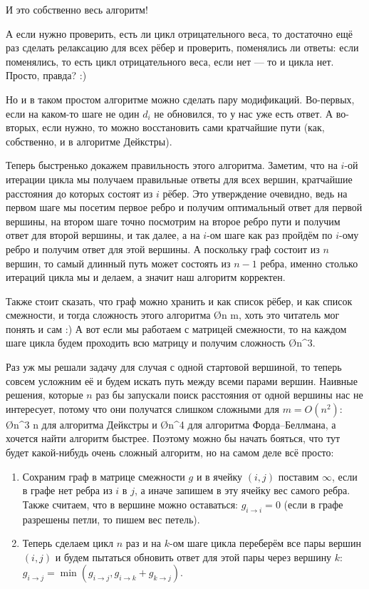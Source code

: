 И это собственно весь алгоритм!

А если нужно проверить, есть ли цикл отрицательного веса, то достаточно ещё раз сделать релаксацию для всех рёбер и проверить, поменялись ли ответы: если поменялись, то есть цикл отрицательного веса, если нет — то и цикла нет. Просто, правда? :)

Но и в таком простом алгоритме можно сделать пару модификаций. Во-первых, если на каком-то шаге не один $d_i$ не обновился, то у нас уже есть ответ. А во-вторых, если нужно, то можно восстановить сами кратчайшие пути (как, собственно, и в алгоритме Дейкстры).

Теперь быстренько докажем правильность этого алгоритма. Заметим, что на $i$-ой итерации цикла мы получаем правильные ответы для всех вершин, кратчайшие расстояния до которых состоят из $i$ рёбер. Это утверждение очевидно, ведь на первом шаге мы посетим первое ребро и получим оптимальный ответ для первой вершины, на втором шаге точно посмотрим на второе ребро пути и получим ответ для второй вершины, и так далее, а на $i$-ом шаге как раз пройдём по $i$-ому ребро и получим ответ для этой вершины. А поскольку граф состоит из $n$ вершин, то самый длинный путь может состоять из $n - 1$ ребра, именно столько итераций цикла мы и делаем, а значит наш алгоритм корректен.

Также стоит сказать, что граф можно хранить и как список рёбер, и как список смежности, и тогда сложность этого алгоритма \O{n m}, хоть это читатель мог понять и сам :) А вот если мы работаем с матрицей смежности, то на каждом шаге цикла будем проходить всю матрицу и получим сложность \O{n^3}.


Раз уж мы решали задачу для случая с одной стартовой вершиной, то теперь совсем усложним её и будем искать путь между всеми парами вершин. Наивные решения, которые $n$ раз бы запускали поиск расстояния от одной вершины нас не интересует, потому что они получатся слишком сложными для $m = O(n^2)$: \O{n^3 \log n} для алгоритма Дейкстры и \O{n^4} для алгоритма Форда–Беллмана, а хочется найти алгоритм быстрее. Поэтому можно бы начать бояться, что тут будет какой-нибудь очень сложный алгоритм, но на самом деле всё просто:

\begin{enumerate}
    \item Сохраним граф в матрице смежности $g$ и в ячейку $(i, j)$ поставим $\infty$, если в графе нет ребра из $i$ в $j$, а иначе запишем в эту ячейку вес самого ребра. Также считаем, что в вершине можно оставаться: $g_{i \to i} = 0$ (если в графе разрешены петли, то пишем вес петель).
    \item Теперь сделаем цикл $n$ раз и на $k$-ом шаге цикла переберём все пары вершин $(i, j)$ и будем пытаться обновить ответ для этой пары через вершину $k$: $g_{i \to j} = \min(g_{i \to j}, g_{i \to k} + g_{k \to j})$.
\end{enumerate}

